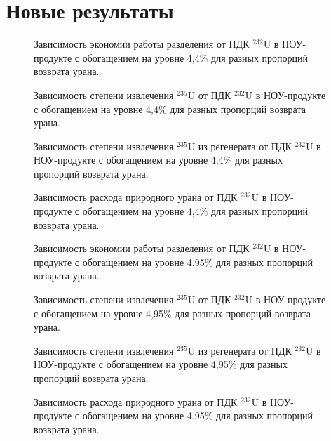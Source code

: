 \chapter{Новые результаты}

\begin{figure}

\caption{{Зависимость экономии работы разделения от ПДК $^{232}$U в НОУ-продукте с обогащением на уровне 4,4\% для разных пропорций возврата урана.{\label{sw44}}}}
\end{figure}

\begin{figure}

\caption{{Зависимость степени извлечения $^{235}$U от ПДК $^{232}$U в НОУ-продукте с обогащением на уровне 4,4\% для разных пропорций возврата урана.{\label{ex44}}}}
\end{figure}

\begin{figure}

\caption{{Зависимость степени извлечения $^{235}$U из регенерата от ПДК $^{232}$U в НОУ-продукте с обогащением на уровне 4,4\% для разных пропорций возврата урана.{\label{exR44}}}}
\end{figure}

\begin{figure}

\caption{{Зависимость расхода природного урана от ПДК $^{232}$U в НОУ-продукте с обогащением на уровне 4,4\% для разных пропорций возврата урана.{\label{F0R44}}}}
\end{figure}


\begin{figure}

\caption{{Зависимость экономии работы разделения от ПДК $^{232}$U в НОУ-продукте с обогащением на уровне 4,95\% для разных пропорций возврата урана.{\label{sw495}}}}
\end{figure}

\begin{figure}

\caption{{Зависимость степени извлечения $^{235}$U от ПДК $^{232}$U в НОУ-продукте с обогащением на уровне 4,95\% для разных пропорций возврата урана.{\label{ex495}}}}
\end{figure}

\begin{figure}

\caption{{Зависимость степени извлечения $^{235}$U из регенерата от ПДК $^{232}$U в НОУ-продукте с обогащением на уровне 4,95\% для разных пропорций возврата урана.{\label{exR495}}}}
\end{figure}

\begin{figure}

\caption{{Зависимость расхода природного урана от ПДК $^{232}$U в НОУ-продукте с обогащением на уровне 4,95\% для разных пропорций возврата урана.{\label{F0R495}}}}
\end{figure}

\clearpage